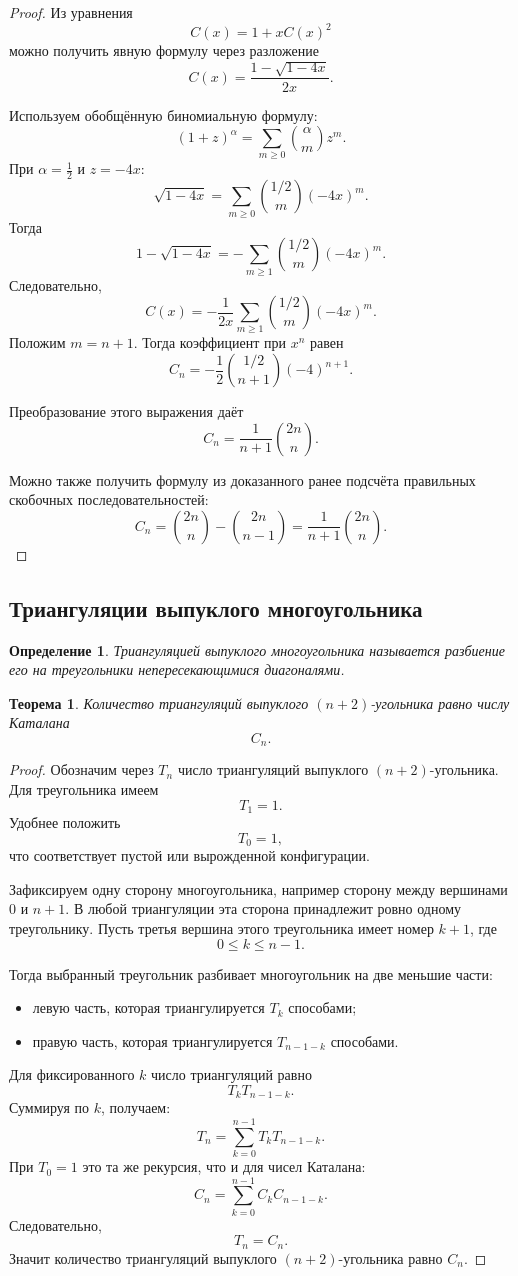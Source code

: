 \documentclass[12pt,a4paper]{article}
\newtheorem{theorem}{Теорема}
\newtheorem{definition}{Определение}
\begin{document}
\begin{proof}
Из уравнения
\[
C(x)=1+xC(x)^2
\]
можно получить явную формулу через разложение
\[
C(x)=\frac{1-\sqrt{1-4x}}{2x}.
\]

Используем обобщённую биномиальную формулу:
\[
(1+z)^\alpha
=
\sum_{m\ge 0}\binom{\alpha}{m}z^m.
\]
При $\alpha=\frac12$ и $z=-4x$:
\[
\sqrt{1-4x}
=
\sum_{m\ge 0}\binom{1/2}{m}(-4x)^m.
\]
Тогда
\[
1-\sqrt{1-4x}
=
-\sum_{m\ge 1}\binom{1/2}{m}(-4x)^m.
\]
Следовательно,
\[
C(x)=
-\frac{1}{2x}\sum_{m\ge 1}\binom{1/2}{m}(-4x)^m.
\]
Положим $m=n+1$. Тогда коэффициент при $x^n$ равен
\[
C_n
=
-\frac12 \binom{1/2}{n+1}(-4)^{n+1}.
\]

Преобразование этого выражения даёт
\[
C_n=\frac{1}{n+1}\binom{2n}{n}.
\]

Можно также получить формулу из доказанного ранее подсчёта правильных скобочных последовательностей:
\[
C_n=
\binom{2n}{n}-\binom{2n}{n-1}
=
\frac{1}{n+1}\binom{2n}{n}.
\]
\end{proof}

\subsection{Триангуляции выпуклого многоугольника}

\begin{definition}
Триангуляцией выпуклого многоугольника называется разбиение его на треугольники непересекающимися диагоналями.
\end{definition}

\begin{theorem}
Количество триангуляций выпуклого $(n+2)$-угольника равно числу Каталана
\[
C_n.
\]
\end{theorem}

\begin{proof}
Обозначим через $T_n$ число триангуляций выпуклого $(n+2)$-угольника. Для треугольника имеем
\[
T_1=1.
\]
Удобнее положить
\[
T_0=1,
\]
что соответствует пустой или вырожденной конфигурации.

Зафиксируем одну сторону многоугольника, например сторону между вершинами $0$ и $n+1$. В любой триангуляции эта сторона принадлежит ровно одному треугольнику. Пусть третья вершина этого треугольника имеет номер $k+1$, где
\[
0\le k\le n-1.
\]

Тогда выбранный треугольник разбивает многоугольник на две меньшие части:
\begin{itemize}
    \item левую часть, которая триангулируется $T_k$ способами;
    \item правую часть, которая триангулируется $T_{n-1-k}$ способами.
\end{itemize}

Для фиксированного $k$ число триангуляций равно
\[
T_kT_{n-1-k}.
\]
Суммируя по $k$, получаем:
\[
T_n=\sum_{k=0}^{n-1}T_kT_{n-1-k}.
\]
При $T_0=1$ это та же рекурсия, что и для чисел Каталана:
\[
C_n=\sum_{k=0}^{n-1}C_kC_{n-1-k}.
\]
Следовательно,
\[
T_n=C_n.
\]
Значит количество триангуляций выпуклого $(n+2)$-угольника равно $C_n$.
\end{proof}
\end{document}
